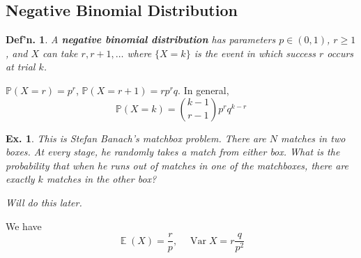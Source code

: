 \documentclass[12pt, a4paper]{book}
\DeclareMathOperator{\E}{\mathbb{E}}
\DeclareMathOperator{\Var}{Var}
\renewcommand{\Pr}{\mathbb{P}}
\newtheorem{definition}[theorem]{Def'n.}
\newtheorem{example}[theorem]{Ex.}
\theoremstyle{nonumberplain}
\begin{document}
\subsection{Negative Binomial Distribution}
\begin{definition}
    A \textbf{negative binomial distribution} has parameters $p\in(0,1)$, $r\geq 1$, and $X$ can take $r,r+1,\ldots$ where $\{X=k\}$ is the event in which success $r$ occurs at trial $k$.
\end{definition}
$\Pr(X=r)=p^r$, $\Pr(X=r+1)=rp^rq$.
In general,
\[\Pr(X=k)=\binom{k-1}{r-1}p^rq^{k-r}\]
\begin{example}
    This is Stefan Banach's matchbox problem.
    There are $N$ matches in two boxes.
    At every stage, he randomly takes a match from either box.
    What is the probability that when he runs out of matches in one of the matchboxes, there are exactly $k$ matches in the other box?

    Will do this later.
\end{example}
We have
\[\E(X)=\frac{r}{p},\quad\Var X=r\frac{q}{p^2}\]
\end{document}
